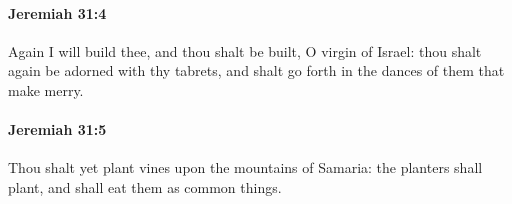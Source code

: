 		\paragraph{Jeremiah 31:4} %
			\label{JEREMIAH-31-4}

			Again I will build thee, and thou shalt be built, O virgin of Israel: thou shalt again be adorned with thy tabrets, and shalt go forth in the dances of them that make merry.


		\paragraph{Jeremiah 31:5} %
			\label{JEREMIAH-31-5}

			Thou shalt yet plant vines upon the mountains of Samaria: the planters shall plant, and shall eat them as common things.


